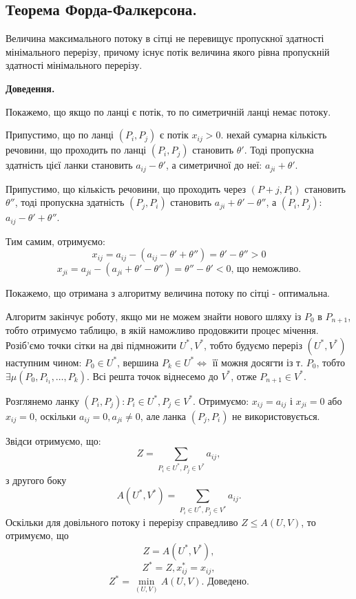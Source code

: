 \documentclass[12pt,a4paper]{book}
\begin{document}
\subsection{Теорема Форда-Фалкерсона.}

Величина максимального потоку в сітці не перевищує пропускної здатності мінімального перерізу, причому існує потік величина якого рівна пропускній здатності мінімального перерізу.

{\bf Доведення.}

Покажемо, що якщо по ланці є потік, то по симетричній ланці немає потоку.

Припустимо, що по ланці $(P_i, P_j)$ є потік $x_{ij}>0$. нехай сумарна кількість речовини, що проходить по ланці $(P_i, P_j)$ становить $\theta'$. Тоді пропускна здатність цієї ланки становить $a_{ij} - \theta'$, а симетричної до неї: $a_{ji} + \theta'$.

Припустимо, що кількість речовини, що проходить через $(P+j, P_i)$ становить $\theta''$, тоді пропускна здатність $(P_j, P_i)$ становить $a_{ji}+\theta'-\theta''$, а $(P_i, P_j)$: $a_{ij}-\theta'+\theta''$.

Тим самим, отримуємо:
\[ x_{ij} = a_{ij} - (a_{ij} - \theta' + \theta'') = \theta' - \theta'' > 0 \]
\[ x_{ji} = a_{ji} - (a_{ji} + \theta' - \theta'') = \theta'' - \theta' < 0 \mbox{, що неможливо.}\]

Покажемо, що отримана з алгоритму величина потоку по сітці - оптимальна.

Алгоритм закінчує роботу, якщо ми не можем знайти нового шляху із $P_0$ в $P_{n+1}$, тобто отримуємо таблицю, в якій наможливо продовжити процес мічення. Розіб’ємо точки сітки на дві підмножити $U^*, V^*$, тобто будуємо переріз $(U^*, V^*)$ наступним чином: $P_0 \in U^*$, вершина $P_k \in U^* \Leftrightarrow$ її можня досягти із т. $P_0$, тобто $\exists \mu(P_0, P_{i_1}, \dots, P_k)$. Всі решта точок віднесемо до $V^*$, отже $P_{n+1} \in V^*$.

Розглянемо ланку $(P_i, P_j): P_i \in U^*, P_j \in V^*$. Отримуємо: $x_{ij}=a_{ij}$ і $x_{ji}=0$ або $x_{ij}=0$, оскільки $a_{ij}=0, a_{ji} \neq 0$, але ланка $(P_j, P_i)$ не використовується.

Звідси отримуємо, що: 
\[ Z= \sum_{P_i \in U^*, P_j \in V^*} a_{ij}, \]
з другого боку
\[ A(U^*, V^*) = \sum_{P_i \in U^*, P_j \in V^*} a_{ij}. \]
Оскільки для довільного потоку і перерізу справедливо $Z \leq A(U, V)$, то отримуємо, що 
\[ Z = A(U^*, V^*), \]
\[ Z^*=Z, x_{ij}^*=x_{ij}, \]
\[ Z^*=\min_{(U,V)} A(U,V). \mbox{ Доведено.}\]
\end{document}
